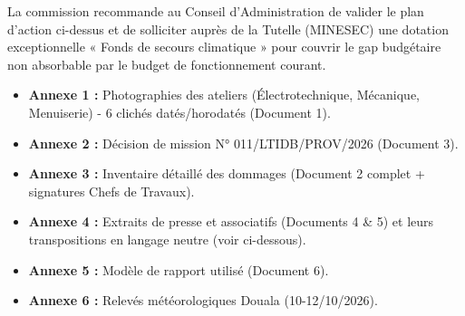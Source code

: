 \documentclass[11pt]{article}
\newcounter{popsec}
\newcounter{popsub}
\newcommand{\courssub}[1]{%
  \stepcounter{popsub}%
  \par\vspace{9pt}\noindent{\popxbold\fontsize{11.5}{13}\selectfont\color{popink}{\color{poporange}\thepopsec.\thepopsub}\hspace{6pt}#1}\par\nopagebreak\vspace{4pt}
}
\begin{document}
\begin{exoresolu}
La commission recommande au Conseil d'Administration de valider le plan d'action ci-dessus et de solliciter auprès de la Tutelle (MINESEC) une dotation exceptionnelle « Fonds de secours climatique » pour couvrir le gap budgétaire non absorbable par le budget de fonctionnement courant.

\courssub{Annexes}
\begin{itemize}
    \item \textbf{Annexe 1 :} Photographies des ateliers (Électrotechnique, Mécanique, Menuiserie) - 6 clichés datés/horodatés (Document 1).
    \item \textbf{Annexe 2 :} Décision de mission N° 011/LTIDB/PROV/2026 (Document 3).
    \item \textbf{Annexe 3 :} Inventaire détaillé des dommages (Document 2 complet + signatures Chefs de Travaux).
    \item \textbf{Annexe 4 :} Extraits de presse et associatifs (Documents 4 \& 5) et leurs transpositions en langage neutre (voir ci-dessous).
    \item \textbf{Annexe 5 :} Modèle de rapport utilisé (Document 6).
    \item \textbf{Annexe 6 :} Relevés météorologiques Douala (10-12/10/2026).
\end{itemize}


\end{exoresolu}
\end{document}
